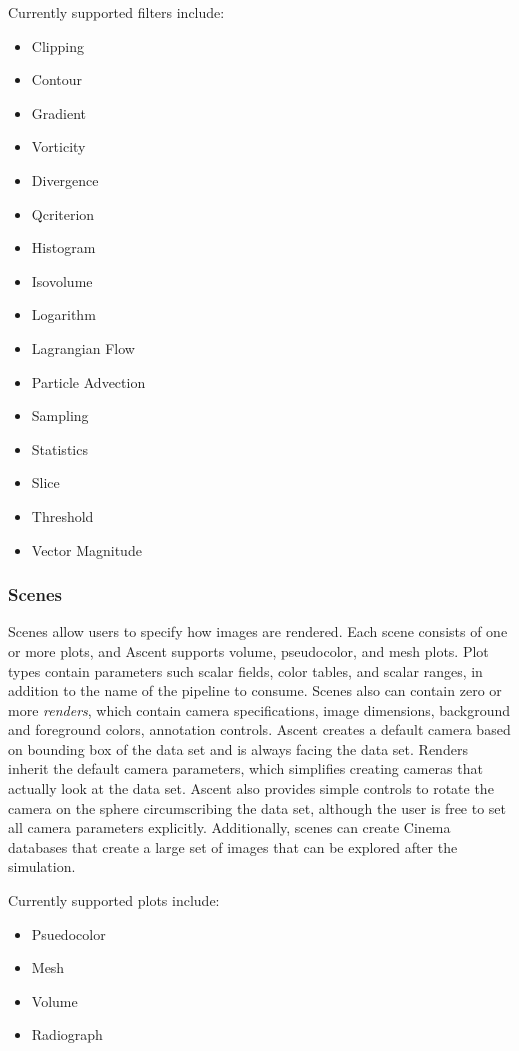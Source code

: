 Currently supported filters include:
\begin{multicols}{2}
\begin{itemize}
\item Clipping
\item Contour
\item Gradient
\item Vorticity
\item Divergence
\item Qcriterion
\item Histogram
\item Isovolume
\item Logarithm
\item Lagrangian Flow
\item Particle Advection
\item Sampling
\item Statistics
\item Slice
\item Threshold
\item Vector Magnitude
\end{itemize}
\end{multicols}
\subsubsection{Scenes}
Scenes allow users to specify how images are rendered.
%
Each scene consists of one or more plots, and Ascent supports volume,
pseudocolor, and mesh plots.
%
Plot types contain parameters such scalar fields, color tables, and scalar ranges,
in addition to the name of the pipeline to consume.
%
Scenes also can contain zero or more \textit{renders}, which contain
camera specifications, image dimensions, background and
foreground colors, annotation controls.
%
Ascent creates a default camera based on bounding box of the data set and
is always facing the data set.
%
Renders inherit the default camera parameters, which simplifies creating
cameras that actually look at the data set.
%
Ascent also provides simple controls to rotate the camera on the
sphere circumscribing the data set, although the user is free to set all
camera parameters explicitly.
%
Additionally, scenes can create Cinema~\cite{AhrensCinema} databases that
create a large set of images that can be explored after the simulation.

Currently supported plots include:
\begin{itemize}
\item Psuedocolor
\item Mesh
\item Volume
\item Radiograph
\end{itemize}

